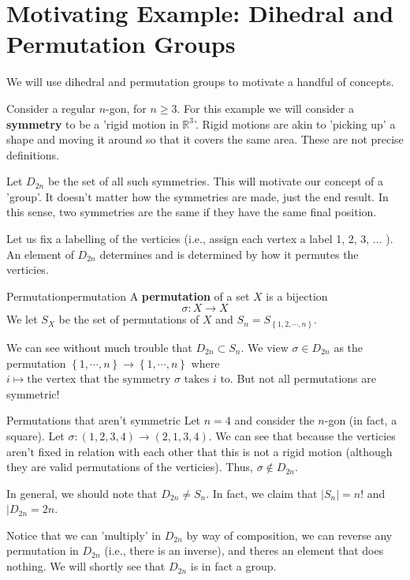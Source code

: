 \documentclass{article}
\begin{document}
\section{Motivating Example: Dihedral and Permutation Groups}

We will use dihedral and permutation groups to motivate a handful of concepts. 

Consider a regular $n$-gon, for $n \geq 3$. For this example we will consider a \textbf{symmetry} to be a 'rigid motion in $\mathbb{R}^3$'. Rigid motions are akin to 'picking up' a shape and moving it around so that it covers the same area. These are not precise definitions.

Let $D_{2n} $ be the set of all such symmetries. This will motivate our concept of a 'group'. It doesn't matter how the symmetries are made, just the end result. In this sense, two symmetries are the same if they have the same final position. 

Let us fix a labelling of the verticies (i.e., assign each vertex a label 1, 2, 3, ... ). An element of $D_{2n} $ determines and is determined by how it permutes the verticies.

\begin{cdef}{Permutation}{permutation}
    A \textbf{permutation} of a set $X$  is a bijection
    \[
        \sigma : X \to X
    \]
    We let $S_{X} $ be the set of permutations of $X$ and $S_n = S_{\left\{ 1, 2, \cdots, n \right\}} $. 
\end{cdef}
We can see without much trouble that $D_{2n} \subset S_n$. We view $\sigma \in D_{2n} $ as the permutation $\left\{ 1, \cdots, n \right\} \to \left\{ 1, \cdots, n \right\}$ where $i \mapsto \text{the vertex that the symmetry $\sigma$ takes $i$ to}$. But not all permutations are symmetric!

\begin{cex}{Permutations that aren't symmetric}{}
Let $n=4$ and consider the $n$-gon (in fact, a square). Let $\sigma: (1,2,3,4) \to (2, 1, 3, 4)$. We can see that because the verticies aren't fixed in relation with each other that this is not a rigid motion (although they are valid permutations of the verticies). Thus, $\sigma \not\in D_{2n} $. 
\end{cex}

In general, we should note that $D_{2n} \neq S_n$. In fact, we claim that $|S_{n}| = n!$ and $|D_{2n} = 2n$.  

Notice that we can 'multiply' in $D_{2n}$ by way of composition, we can reverse any permutation in $D_{2n} $ (i.e., there is an inverse), and theres an element that does nothing. We will shortly see that $D_{2n} $ is in fact a group.
\end{document}
